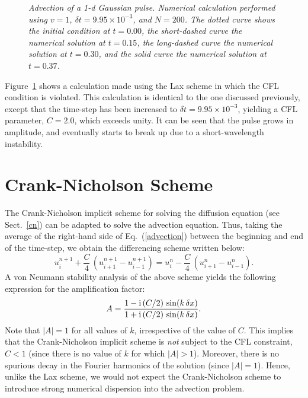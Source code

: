\begin{figure}
\epsfysize=3in
\centerline{}
\caption{\em Advection of a 1-d Gaussian pulse.
Numerical  calculation performed using
$v=1$, $\delta t = 9.95\times 10^{-3}$, and $N=200$.  The
dotted curve shows the initial condition at $t=0.00$, the short-dashed curve  the numerical solution
at $t=0.15$, the long-dashed curve  the numerical solution
at $t=0.30$, and the solid  curve  the numerical solution at 
$t=0.37$. }\label{inst}
\end{figure}

Figure~\ref{inst} shows a calculation made using the Lax scheme in
which the CFL condition is violated. This
calculation is identical to the one discussed previously, except that the time-step
has been increased to $\delta t=9.95\times 10^{-3}$,
yielding a CFL parameter, $C=2.0$, which exceeds unity. It can be seen that
the pulse grows in amplitude, and eventually starts to break up due to a short-wavelength
instability. 

\section{Crank-Nicholson Scheme}\label{cnwave}
The Crank-Nicholson implicit scheme for solving the diffusion equation (see Sect.~\ref{cn})
 can be adapted to solve the advection equation.
Thus, taking the average of the right-hand side of Eq.~(\ref{advection}) between the
beginning and  end of  the time-step, we obtain the  differencing
scheme written below:
\begin{equation}
u_i^{n+1} + \frac{C}{4}\,(u_{i+1}^{n+1}-u_{i-1}^{n+1}) = u_i^n - \frac{C}{4}\,(u_{i+1}^{n}-u_{i-1}^{n}).
\end{equation}
A von Neumann stability analysis of the above scheme yields the following
expression for the amplification factor:
\begin{equation}
A = \frac{1 - {\rm i} \,(C/2)\,\sin (k \,\delta x)}{1 + {\rm i} \,(C/2)\,\sin (k \,\delta x)}.
\end{equation}
Note that $|A| = 1$ for all values of $k$, irrespective of the value of $C$. This implies that
the Crank-Nicholson implicit scheme is {\em not} subject to the CFL constraint, $C<1$
(since there is no value of $k$ for which $|A|>1$).  Moreover,
there is no spurious decay in the Fourier harmonics
of the solution (since $|A|=1$). 
Hence, unlike the Lax scheme, we would not expect the  Crank-Nicholson scheme to introduce
strong numerical dispersion into the advection problem.


